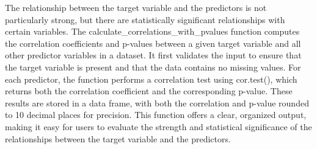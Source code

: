 \documentclass[
]{article}
\begin{document}
The relationship between the target variable and the predictors is not
particularly strong, but there are statistically significant
relationships with certain variables. The
calculate\_correlations\_with\_pvalues function computes the correlation
coefficients and p-values between a given target variable and all other
predictor variables in a dataset. It first validates the input to ensure
that the target variable is present and that the data contains no
missing values. For each predictor, the function performs a correlation
test using cor.test(), which returns both the correlation coefficient
and the corresponding p-value. These results are stored in a data frame,
with both the correlation and p-value rounded to 10 decimal places for
precision. This function offers a clear, organized output, making it
easy for users to evaluate the strength and statistical significance of
the relationships between the target variable and the predictors.
\end{document}
